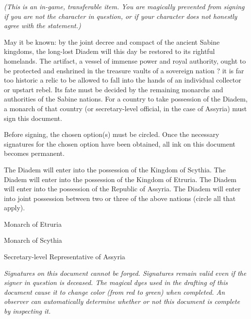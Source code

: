 \documentclass[white]{Kos}
\begin{document}
\name{\wDiademContract{}}

\emph{(This is an in-game, transferable item. You are magically prevented from signing if you are not the character in question, or if your character does not honestly agree with the statement.)}

May it be known: by the joint decree and compact of the ancient Sabine kingdoms, the long-lost Diadem will this day be restored to its rightful homelands. The artifact, a vessel of immense power and royal authority, ought to be protected and enshrined in the treasure vaults of a sovereign nation ? it is far too historic a relic to be allowed to fall into the hands of an individual collector or upstart rebel. Its fate must be decided by the remaining monarchs and authorities of the Sabine nations. For a country to take possession of the Diadem, a monarch of that country (or secretary-level official, in the case of Assyria) must sign this document.

Before signing, the chosen option(s) must be circled. Once the necessary signatures for the chosen option have been obtained, all ink on this document becomes permanent.

The Diadem will enter into the possession of the Kingdom of Scythia.
The Diadem will enter into the possession of the Kingdom of Etruria.
The Diadem will enter into the possession of the Republic of Assyria.
The Diadem will enter into joint possession between two or three of the above nations (circle all that apply).

\hrulefill

Monarch of Etruria

\hrulefill

Monarch of Scythia

\hrulefill

Secretary-level Representative of Assyria

\emph{Signatures on this document cannot be forged. Signatures remain valid even if the signer in question is deceased. The magical dyes used in the drafting of this document cause it to change color (from red to green) when completed. An observer can automatically determine whether or not this document is complete by inspecting it.}
\end{document}
